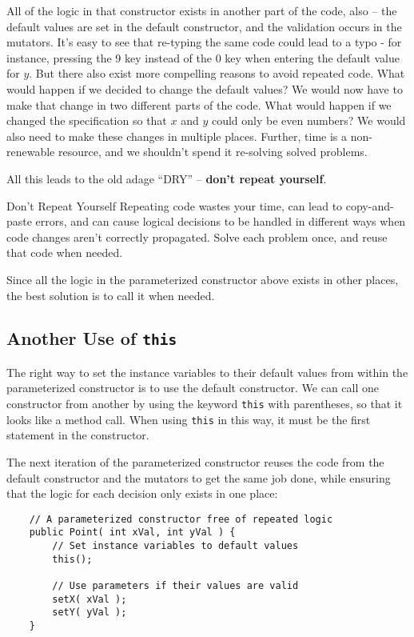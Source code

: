 All of the logic in that constructor exists in another part of the code, also -- the default values are set in the default constructor, and the validation occurs in the mutators.  It's easy to see that re-typing the same code could lead to a typo - for instance, pressing the 9 key instead of the 0 key when entering the default value for $y$.  But there also exist more compelling reasons to avoid repeated code.  What would happen if we decided to change the default values?  We would now have to make that change in two different parts of the code.  What would happen if we changed the specification so that $x$ and $y$ could only be even numbers?  We would also need to make these changes in multiple places.  Further, time is a non-renewable resource, and we shouldn't spend it re-solving solved problems.

All this leads to the old adage ``DRY'' -- \textbf{don't repeat yourself}.

\begin{tip}{Don't Repeat Yourself}
    Repeating code wastes your time, can lead to copy-and-paste errors, and can cause logical decisions to be handled in different ways when code changes aren't correctly propagated.  Solve each problem once, and reuse that code when needed.
\end{tip}

Since all the logic in the parameterized constructor above exists in other places, the best solution is to call it when needed.

\subsection{Another Use of \texttt{this}}

The right way to set the instance variables to their default values from within the parameterized constructor is to use the default constructor.  We can call one constructor from another by using the keyword \texttt{this} with parentheses, so that it looks like a method call.  When using \texttt{this} in this way, it must be the first statement in the constructor.

The next iteration of the parameterized constructor reuses the code from the default constructor and the mutators to get the same job done, while ensuring that the logic for each decision only exists in one place:

\begin{verbatim}
    // A parameterized constructor free of repeated logic
    public Point( int xVal, int yVal ) {
        // Set instance variables to default values
        this();

        // Use parameters if their values are valid
        setX( xVal );
        setY( yVal );
    }
\end{verbatim}
